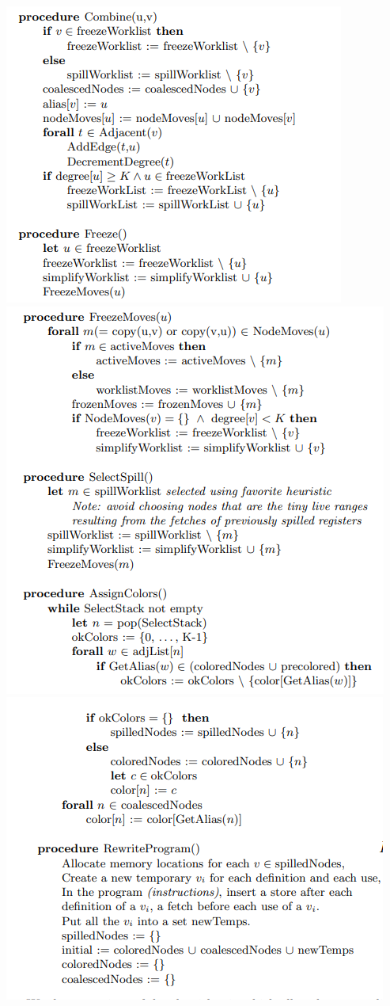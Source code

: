 \begin{center}
    \includegraphics[scale=0.6]{img/code8.png}
    \includegraphics[scale=0.6]{img/code9.png}
    \includegraphics[scale=0.6]{img/code10.png}

\end{center}

